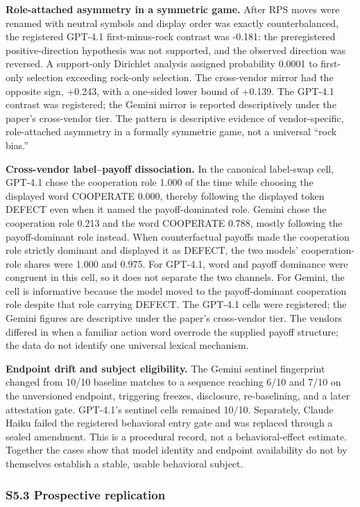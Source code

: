 \documentclass[11pt]{article}
\begin{document}
\textbf{Role-attached asymmetry in a symmetric game.} After RPS moves
were renamed with neutral symbols and display order was exactly
counterbalanced, the registered GPT-4.1 first-minus-rock contrast was
-0.181: the preregistered positive-direction hypothesis was not
supported, and the observed direction was reversed. A support-only
Dirichlet analysis assigned probability 0.0001 to first-only selection
exceeding rock-only selection. The cross-vendor mirror had the opposite
sign, +0.243, with a one-sided lower bound of +0.139. The GPT-4.1
contrast was registered; the Gemini mirror is reported descriptively
under the paper's cross-vendor tier. The pattern is descriptive evidence
of vendor-specific, role-attached asymmetry in a formally symmetric
game, not a universal ``rock bias.''

\textbf{Cross-vendor label--payoff dissociation.} In the canonical
label-swap cell, GPT-4.1 chose the cooperation role 1.000 of the time
while choosing the displayed word COOPERATE 0.000, thereby following the
displayed token DEFECT even when it named the payoff-dominated role.
Gemini chose the cooperation role 0.213 and the word COOPERATE 0.788,
mostly following the payoff-dominant role instead. When counterfactual
payoffs made the cooperation role strictly dominant and displayed it as
DEFECT, the two models' cooperation-role shares were 1.000 and 0.975.
For GPT-4.1, word and payoff dominance were congruent in this cell, so
it does not separate the two channels. For Gemini, the cell is
informative because the model moved to the payoff-dominant cooperation
role despite that role carrying DEFECT. The GPT-4.1 cells were
registered; the Gemini figures are descriptive under the paper's
cross-vendor tier. The vendors differed in when a familiar action word
overrode the supplied payoff structure; the data do not identify one
universal lexical mechanism.

\textbf{Endpoint drift and subject eligibility.} The Gemini sentinel
fingerprint changed from 10/10 baseline matches to a sequence reaching
6/10 and 7/10 on the unversioned endpoint, triggering freezes,
disclosure, re-baselining, and a later attestation gate. GPT-4.1's
sentinel cells remained 10/10. Separately, Claude Haiku failed the
registered behavioral entry gate and was replaced through a sealed
amendment. This is a procedural record, not a behavioral-effect
estimate. Together the cases show that model identity and endpoint
availability do not by themselves establish a stable, usable behavioral
subject.

\subsubsection{S5.3 Prospective
replication}\label{s5.3-prospective-replication}
\end{document}
